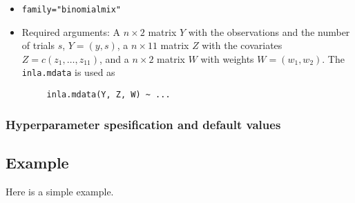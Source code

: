 \documentclass[a4paper,11pt]{article}
\begin{document}
\begin{itemize}
\item \texttt{family="binomialmix"}
\item Required arguments: A $n\times 2$ matrix $Y$ with the
observations and the number of trials $s$,  $Y=(y, s)$,
    a $n\times 11$ matrix $Z$ with the covariates $Z=c(z_1, \ldots, z_{11})$,
    and a $n\times 2$ matrix $W$ with weights $W=(w_1, w_2)$. The
    \texttt{inla.mdata} is used as
\begin{verbatim}
     inla.mdata(Y, Z, W) ~ ...
\end{verbatim}
\end{itemize}


\clearpage
\subsubsection*{Hyperparameter spesification and default values}
{\small }

\clearpage
\subsection*{Example}
Here is a simple example.

{\small }
\end{document}
